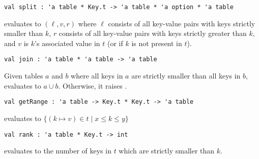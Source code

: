 \begin{cluster}
\label{grp:grm:ordtable-interface::split}

\begin{gram}[split]
\label{grm:ordtable-interface::split}
\begin{verbatim}
val split : 'a table * Key.t -> 'a table * 'a option * 'a table
\end{verbatim}
 evaluates to $(\ell, v, r)$ where $\ell$ consists of all
key-value pairs with keys strictly smaller than $k$, $r$ consists of all key-value
pairs with keys strictly greater than $k$, and $v$ is $k$'s associated value
in $t$ (or  if $k$ is not present in $t$).

\end{gram}
\end{cluster}

\begin{cluster}
\label{grp:grm:ordtable-interface::join}

\begin{gram}[join]
\label{grm:ordtable-interface::join}
\begin{verbatim}
val join : 'a table * 'a table -> 'a table
\end{verbatim}
Given tables $a$ and $b$ where all keys in $a$ are strictly smaller than all
keys in $b$,  evaluates to $a \cup b$. Otherwise, it raises
.

\end{gram}
\end{cluster}

\begin{cluster}
\label{grp:grm:ordtable-interface::getrange}

\begin{gram}[getRange]
\label{grm:ordtable-interface::getrange}
\begin{verbatim}
val getRange : 'a table -> Key.t * Key.t -> 'a table
\end{verbatim}
 evaluates to $\{(k \mapsto v) \in t \mathbin| x \leq k \leq y\}$

\end{gram}
\end{cluster}

\begin{cluster}
\label{grp:grm:ordtable-interface::rank}

\begin{gram}[rank]
\label{grm:ordtable-interface::rank}
\begin{verbatim}
val rank : 'a table * Key.t -> int
\end{verbatim}
 evaluates to the number of keys in $t$ which are strictly
smaller than $k$.

\end{gram}
\end{cluster}


